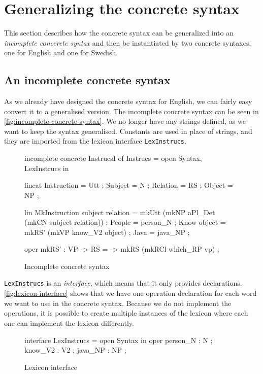 \section{Generalizing the concrete syntax}

This section describes how the concrete syntax can be generalized into an \emph{incomplete concerete syntax} and then be instantiated by two concrete syntaxes, one for English and one for Swedish.

\subsection*{An incomplete concrete syntax}

As we already have designed the concrete syntax for English, we can fairly easy convert it to a generalised version. The incomplete concrete syntax can be seen in \autoref{fig:incomplete-concrete-syntax}. We no longer have any strings defined, as we want to keep the syntax generalised. Constants are used in place of strings, and they are imported from the lexicon interface  \texttt{LexInstrucs}.

\begin{figure}[h]
\begin{code}
incomplete concrete InstrucsI of Instrucs = open Syntax, LexInstrucs in {
  lincat
    Instruction = Utt ;
    Subject = N ;
    Relation = RS ;
    Object = NP ;

  lin
    MkInstruction subject relation = mkUtt 
                                      (mkNP aPl_Det (mkCN subject relation)) ;
    People = person_N ;
    Know object = mkRS' (mkVP know_V2 object) ;
    Java = java_NP ;

   oper
      mkRS' : VP -> RS = \vp -> mkRS (mkRCl which_RP vp) ;
}
\end{code}
\caption{Incomplete concrete syntax\label{fig:incomplete-concrete-syntax}}
\end{figure}

\texttt{LexInstrucs} is an \emph{interface}, which means that it only provides declarations. \autoref{fig:lexicon-interface} shows that we have one operation declaration for each word we want to use in the concrete syntax. Because we do not implement the operations, it is possible to create multiple instances of the lexicon where each one can implement the lexicon differently.

\begin{figure}[H]
\begin{code}
interface LexInstrucs = open Syntax in {
   oper
     person_N : N ;
     know_V2  : V2 ;
     java_NP  : NP ;
}
\end{code}
\caption{Lexicon interface\label{fig:lexicon-interface}}
\end{figure}

